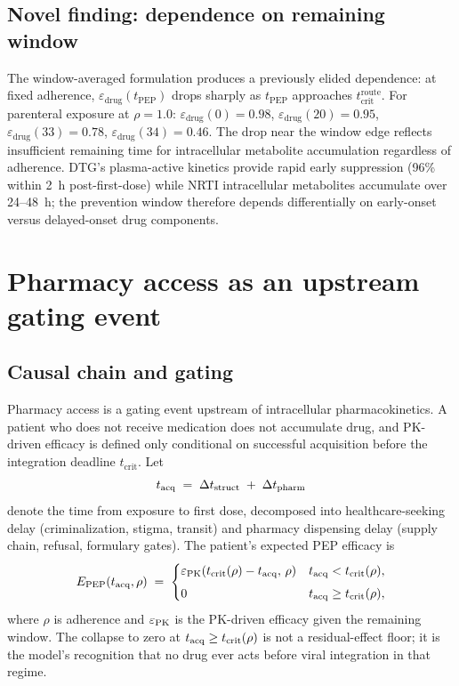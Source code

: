 \documentclass[11pt]{article}
\theoremstyle{definition}
\theoremstyle{remark}
\newcommand{\tcrit}{t_{\text{crit}}}
\begin{document}
\subsection{Novel finding: dependence on remaining window}

The window-averaged formulation produces a previously elided dependence: at fixed adherence, $\varepsilon_{\text{drug}}(t_{\text{PEP}})$ drops sharply as $t_{\text{PEP}}$ approaches $\tcrit^{\text{route}}$. For parenteral exposure at $\rho = 1.0$: $\varepsilon_{\text{drug}}(0) = 0.98$, $\varepsilon_{\text{drug}}(20) = 0.95$, $\varepsilon_{\text{drug}}(33) = 0.78$, $\varepsilon_{\text{drug}}(34) = 0.46$. The drop near the window edge reflects insufficient remaining time for intracellular metabolite accumulation regardless of adherence. DTG's plasma-active kinetics provide rapid early suppression (96\% within 2~h post-first-dose) while NRTI intracellular metabolites accumulate over 24--48~h; the prevention window therefore depends differentially on early-onset versus delayed-onset drug components.



\section{Pharmacy access as an upstream gating event}
\label{sec:S2}

\subsection{Causal chain and gating}
\label{sec:S2_chain}

Pharmacy access is a gating event upstream of intracellular
pharmacokinetics.  A patient who does not receive medication does not
accumulate drug, and PK-driven efficacy is defined only conditional on
successful acquisition before the integration deadline $\tcrit$.  Let
\[
  t_{\rm acq} \;=\; \Delta t_{\rm struct} \;+\; \Delta t_{\rm pharm}
\]
denote the time from exposure to first dose, decomposed into
healthcare-seeking delay (criminalization, stigma, transit) and pharmacy
dispensing delay (supply chain, refusal, formulary gates).  The patient's
expected PEP efficacy is
\[
  E_{\rm PEP}(t_{\rm acq}, \rho) \;=\;
  \begin{cases}
    \varepsilon_{\rm PK}\!\left(t_{\rm crit}(\rho) - t_{\rm acq},\, \rho\right)
      & t_{\rm acq} < t_{\rm crit}(\rho), \\[0.4em]
    0 & t_{\rm acq} \ge t_{\rm crit}(\rho),
  \end{cases}
\]
where $\rho$ is adherence and $\varepsilon_{\rm PK}$ is the PK-driven
efficacy given the remaining window.  The collapse to zero at
$t_{\rm acq} \ge t_{\rm crit}(\rho)$ is not a residual-effect floor; it is
the model's recognition that no drug ever acts before viral integration
in that regime.
\end{document}
